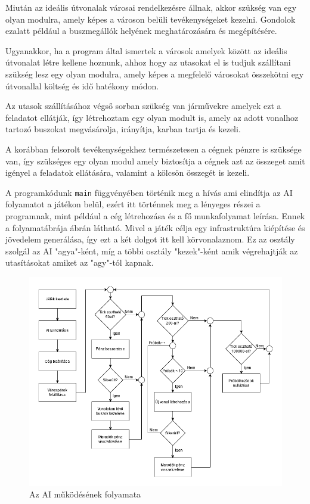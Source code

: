 Miután az ideális útvonalak városai rendelkezésre állnak, akkor szükség van egy olyan modulra, amely képes a városon belüli tevékenységeket kezelni. Gondolok ezalatt például a buszmegállók helyének meghatározására és megépítésére.

Ugyanakkor, ha a program által ismertek a városok amelyek között az ideális útvonalat létre kellene hoznunk, ahhoz hogy az utasokat el is tudjuk szállítani szükség lesz egy olyan modulra, amely képes a megfelelő városokat összekötni egy útvonallal költség és idő hatékony módon.

Az utasok szállításához végső sorban szükség van járművekre amelyek ezt a feladatot ellátják, így létrehoztam egy olyan modult is, amely az adott vonalhoz tartozó buszokat megvásárolja, irányítja, karban tartja és kezeli.

A korábban felsorolt tevékenységekhez természetesen a cégnek pénzre is szüksége van, így szükséges egy olyan modul amely biztosítja a cégnek azt az összeget amit igényel a feladatok ellátására, valamint a kölcsön összegét is kezeli.



A programkódunk \texttt{main} függvényében történik meg a hívás ami elindítja az AI folyamatot a játékon belül, ezért itt történnek meg a lényeges részei a programnak, mint például a cég létrehozása és a fő munkafolyamat leírása. Ennek a folyamatábrája  ábrán látható. Mivel a játék célja egy infrastruktúra kiépítése és jövedelem generálása, így ezt a két dolgot itt kell körvonalaznom. Ez az osztály szolgál az AI "agya"-ként, míg a többi osztály "kezek"-ként amik végrehajtják az utasításokat amiket az "agy"-tól kapnak.

\begin{figure}
	\centering
	\includegraphics[width=\textwidth]{images/folyamat.png}
	\caption{Az AI működésének folyamata}
	\label{fig:folyamat}
\end{figure}

